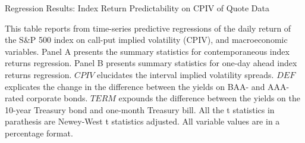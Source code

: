 \begin{table}[h]

\caption{Regression Results: Index Return Predictability on CPIV of Quote Data}\label{table:regression2}
\begin{threeparttable}

\medskip

{\scriptsize 
This table reports from time-series predictive regressions of the daily return of the S\&P 500 index on call-put implied volatility (CPIV), and macroeconomic variables. Panel A presents the summary statistics for contemporaneous index returns regression. Panel B presents summary statistics for one-day ahead index returns regression. $CPIV$ elucidates the interval implied volatility spreads. $DEF$ explicates the change in the difference between the yields on BAA- and AAA-rated corporate bonds. $TERM$ expounds the difference between the yields on the 10-year Treasury bond and one-month Treasury bill. All the t statistics in parathesis are Newey-West t statistics adjusted. All variable values are in a percentage format.  
}
\medskip

\begin{subtable}[t]{\linewidth}


\end{subtable}
\end{threeparttable}
\end{table}
